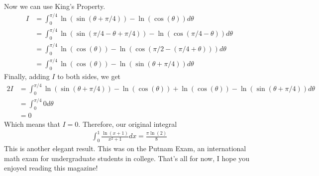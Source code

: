 \documentclass[12pt]{article}
\newtheorem{theorem}{Theorem}[section]
\theoremstyle{definition}
\theoremstyle{remark}
\begin{document}
    Now we can use King's Property.
    \begin{align*}
        I &= \int_{0}^{\pi/4} \ln(\sin(\theta+\pi/4)) - \ln(\cos(\theta))d\theta \\ 
        &= \int_{0}^{\pi/4} \ln(\sin(\pi/4 - \theta + \pi/4)) - \ln(\cos(\pi/4 - \theta))d\theta \\ 
        &= \int_{0}^{\pi/4} \ln(\cos(\theta)) - \ln(\cos(\pi/2 - (\pi/4 + \theta)))d\theta \\ 
        &= \int_{0}^{\pi/4} \ln(\cos(\theta)) - \ln(\sin(\theta + \pi/4))d\theta
    \end{align*}
    Finally, adding $I$ to both sides, we get 
    \begin{align*}
        2I &= \int_{0}^{\pi/4} \ln(\sin(\theta + \pi/4)) - \ln(\cos(\theta)) + \ln(\cos(\theta)) - \ln(\sin(\theta+\pi/4))d\theta \\ 
        &= \int_{0}^{\pi/4} 0d\theta \\ 
        &= 0
    \end{align*}
    Which means that $I = 0$. 
    Therefore, our original integral 
    \begin{align*}
        \int_{0}^{1} \frac{\ln(x+1)}{x^2+1}dx = \frac{\pi \ln(2)}{8}
    \end{align*}
    This is another elegant result.
    This was on the Putnam Exam, an international math exam for undergraduate students in college.
    That's all for now, I hope you enjoyed reading this magazine!
\end{document}
